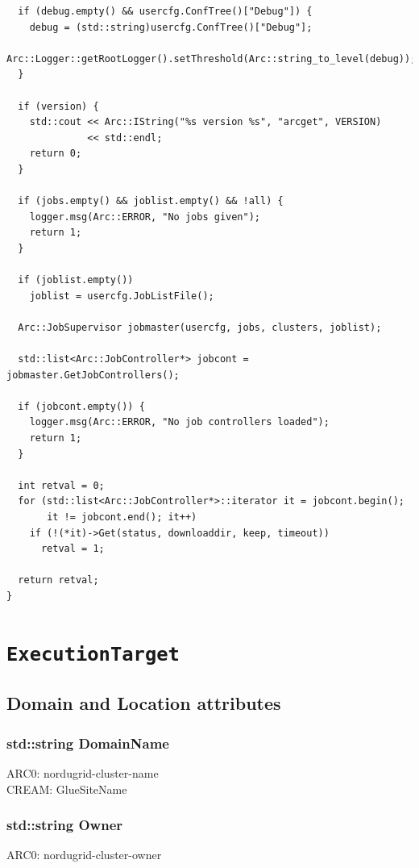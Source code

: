 \documentclass{book}
\newcommand{\ExecutionTarget}{\texttt{ExecutionTarget}}
\begin{document}
\begin{shaded}
\begin{verbatim}
  if (debug.empty() && usercfg.ConfTree()["Debug"]) {
    debug = (std::string)usercfg.ConfTree()["Debug"];
    Arc::Logger::getRootLogger().setThreshold(Arc::string_to_level(debug));
  }

  if (version) {
    std::cout << Arc::IString("%s version %s", "arcget", VERSION)
              << std::endl;
    return 0;
  }

  if (jobs.empty() && joblist.empty() && !all) {
    logger.msg(Arc::ERROR, "No jobs given");
    return 1;
  }

  if (joblist.empty())
    joblist = usercfg.JobListFile();

  Arc::JobSupervisor jobmaster(usercfg, jobs, clusters, joblist);

  std::list<Arc::JobController*> jobcont = jobmaster.GetJobControllers();

  if (jobcont.empty()) {
    logger.msg(Arc::ERROR, "No job controllers loaded");
    return 1;
  }

  int retval = 0;
  for (std::list<Arc::JobController*>::iterator it = jobcont.begin();
       it != jobcont.end(); it++)
    if (!(*it)->Get(status, downloaddir, keep, timeout))
      retval = 1;

  return retval;
}
\end{verbatim}
\end{shaded}

\appendix

\chapter{{\ExecutionTarget}}
\label{app:ExTarget}

\section{Domain and Location attributes}

\subsection*{std::string DomainName}

ARC0: nordugrid-cluster-name \\
CREAM: GlueSiteName

\subsection*{std::string Owner}

ARC0: nordugrid-cluster-owner
\end{document}
